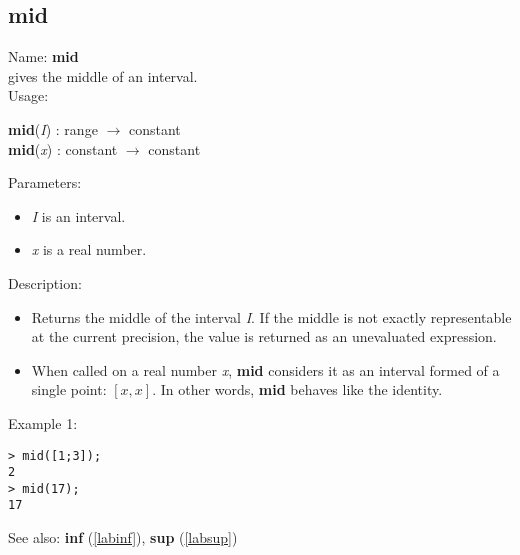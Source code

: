 \subsection{mid}
\label{labmid}
\noindent Name: \textbf{mid}\\
gives the middle of an interval.\\
\noindent Usage: 
\begin{center}
\textbf{mid}(\emph{I}) : \textsf{range} $\rightarrow$ \textsf{constant}
\\ 
\textbf{mid}(\emph{x}) : \textsf{constant} $\rightarrow$ \textsf{constant}
\\ 
\end{center}
Parameters: 
\begin{itemize}
\item \emph{I} is an interval.
\item \emph{x} is a real number.
\end{itemize}
\noindent Description: \begin{itemize}

\item Returns the middle of the interval \emph{I}. If the middle is not exactly
   representable at the current precision, the value is returned as an
   unevaluated expression.

\item When called on a real number \emph{x}, \textbf{mid} considers it as an interval formed
   of a single point: $\left[ x, x\right]$. In other words, \textbf{mid} behaves like the identity.
\end{itemize}
\noindent Example 1: 
\begin{center}\begin{minipage}{15cm}\begin{Verbatim}[frame=single]
> mid([1;3]);
2
> mid(17);
17
\end{Verbatim}
\end{minipage}\end{center}
See also: \textbf{inf} (\ref{labinf}), \textbf{sup} (\ref{labsup})
